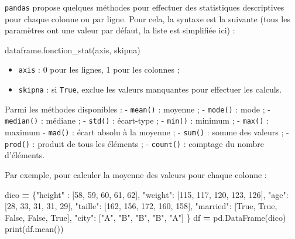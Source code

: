 \documentclass[12pt,]{book}
\newenvironment{Shaded}{\begin{snugshade}}{\end{snugshade}}
\newcommand{\DecValTok}[1]{\textcolor[rgb]{0.00,0.00,0.81}{#1}}
\newcommand{\StringTok}[1]{\textcolor[rgb]{0.31,0.60,0.02}{#1}}
\newcommand{\VariableTok}[1]{\textcolor[rgb]{0.00,0.00,0.00}{#1}}
\newcommand{\OperatorTok}[1]{\textcolor[rgb]{0.81,0.36,0.00}{\textbf{#1}}}
\newcommand{\BuiltInTok}[1]{#1}
\newcommand{\NormalTok}[1]{#1}
\providecommand{\tightlist}{%
  \setlength{\itemsep}{0pt}\setlength{\parskip}{0pt}}
\numberwithin{equation}{section}
\numberwithin{countremarque}{section}
\begin{document}
\texttt{pandas} propose quelques méthodes pour effectuer des
statistiques descriptives pour chaque colonne ou par ligne. Pour cela,
la syntaxe est la suivante (tous les paramètres ont une valeur par
défaut, la liste est simplifiée ici) :

\begin{Shaded}
\begin{Highlighting}[]
\NormalTok{dataframe.fonction_stat(axis, skipna)}
\end{Highlighting}
\end{Shaded}

\begin{itemize}
\tightlist
\item
  \texttt{axis} : 0 pour les lignes, 1 pour les colonnes ;
\item
  \texttt{skipna} : si \texttt{True}, exclue les valeurs manquantes pour
  effectuer les calculs.
\end{itemize}

Parmi les méthodes disponibles : - \texttt{mean()} : moyenne ; -
\texttt{mode()} : mode ; - \texttt{median()} : médiane ; -
\texttt{std()} : écart-type ; - \texttt{min()} : minimum ; -
\texttt{max()} : maximum - \texttt{mad()} : écart absolu à la moyenne ;
- \texttt{sum()} : somme des valeurs ; - \texttt{prod()} : produit de
tous les éléments ; - \texttt{count()} : comptage du nombre d'éléments.

Par exemple, pour calculer la moyenne des valeurs pour chaque colonne :

\begin{Shaded}
\begin{Highlighting}[]
\NormalTok{dico }\OperatorTok{=}\NormalTok{ \{}\StringTok{"height"}\NormalTok{ : [}\DecValTok{58}\NormalTok{, }\DecValTok{59}\NormalTok{, }\DecValTok{60}\NormalTok{, }\DecValTok{61}\NormalTok{, }\DecValTok{62}\NormalTok{],}
        \StringTok{"weight"}\NormalTok{: [}\DecValTok{115}\NormalTok{, }\DecValTok{117}\NormalTok{, }\DecValTok{120}\NormalTok{, }\DecValTok{123}\NormalTok{, }\DecValTok{126}\NormalTok{],}
        \StringTok{"age"}\NormalTok{: [}\DecValTok{28}\NormalTok{, }\DecValTok{33}\NormalTok{, }\DecValTok{31}\NormalTok{, }\DecValTok{31}\NormalTok{, }\DecValTok{29}\NormalTok{],}
        \StringTok{"taille"}\NormalTok{: [}\DecValTok{162}\NormalTok{, }\DecValTok{156}\NormalTok{, }\DecValTok{172}\NormalTok{, }\DecValTok{160}\NormalTok{, }\DecValTok{158}\NormalTok{],}
        \StringTok{"married"}\NormalTok{: [}\VariableTok{True}\NormalTok{, }\VariableTok{True}\NormalTok{, }\VariableTok{False}\NormalTok{, }\VariableTok{False}\NormalTok{, }\VariableTok{True}\NormalTok{],}
        \StringTok{"city"}\NormalTok{: [}\StringTok{"A"}\NormalTok{, }\StringTok{"B"}\NormalTok{, }\StringTok{"B"}\NormalTok{, }\StringTok{"B"}\NormalTok{, }\StringTok{"A"}\NormalTok{]}
\NormalTok{       \} }
\NormalTok{df }\OperatorTok{=}\NormalTok{ pd.DataFrame(dico)}
\BuiltInTok{print}\NormalTok{(df.mean())}
\end{Highlighting}
\end{Shaded}
\end{document}
